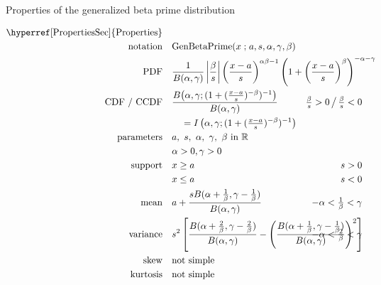 

\begin{table*}[p]
\caption[Generalized beta prime distribution -- Properties]{Properties of the generalized beta prime distribution}
\begin{align*}
 \text{\hyperref[PropertiesSec]{Properties}}  \quad& \\
\text{notation} \quad & \text{GenBetaPrime}(x\given a, s, \alpha,\gamma,\beta)   \checked
\\
\text{PDF}\quad &    \frac{1}{B(\alpha, \gamma)} \left|\frac{\beta}{s}\right|	
\left(\frac{x-a}{s}\right)^{\alpha\beta -1} \left(1+ \left(\frac{x-a}{s}\right)^\beta \right)^{-\alpha-\gamma } \checked
\hspace{-30em}
\\
\text{CDF / CCDF} \quad  &  
\frac{B\big(\alpha, \gamma; (1+(\tfrac{x-a}{s})^{-\beta})^{-1} \big) }{B(\alpha,\gamma)} \checked
\hspace{-7em}
& \tfrac{\beta}{s} >0 \,\big/ \, \tfrac{\beta}{s} <0
\\ 
& \quad = I\left(  \alpha,\gamma; (1+(\tfrac{x-a}{s})^{-\beta})^{-1} \right)  \checked
\\
\text{parameters}\quad &   a,\ s,\ \alpha,\ \gamma,\ \beta \text{ in } \Real \checked 
\\ & \alpha>0, \gamma>0	\checked
\\
\text{support} \quad &    x \geq a &  s > 0 										
\\
&  x\leq a  &  s < 0 
\\
\text{mean} \quad  &   a+\frac{s B(\alpha+\tfrac{1}{\beta},\gamma- \tfrac{1}{\beta}) }{B(\alpha,\gamma)} 
\checked &   -\alpha< \tfrac{1}{\beta} <\gamma \checked
\\
\text{variance} \quad  &s^2\left[\frac{ B(\alpha+\tfrac{2}{\beta},\gamma- \tfrac{2}{\beta}) }{B(\alpha,\gamma)} -  \left(\frac{ B(\alpha+\tfrac{1}{\beta},\gamma- \tfrac{1}{\beta}) }{B(\alpha,\gamma)}\right)^2 \right]  \hspace{-15em}
& -\alpha< \tfrac{2}{\beta} <\gamma \checked
\\
\text{skew} \quad  &  \text{not simple}
\\
\text{kurtosis} \quad  &  \text{not simple}

\end{align*}
\end{table*}
